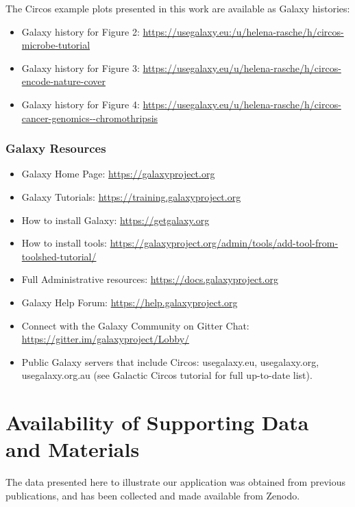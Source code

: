 The Circos example plots presented in this work are available as Galaxy histories:

\begin{itemize}
\item Galaxy history for Figure 2: \url{https://usegalaxy.eu:/u/helena-rasche/h/circos-microbe-tutorial}
\item Galaxy history for Figure 3: \url{https://usegalaxy.eu/u/helena-rasche/h/circos-encode-nature-cover}
\item Galaxy history for Figure 4: \url{https://usegalaxy.eu/u/helena-rasche/h/circos-cancer-genomics--chromothripsis}
\end{itemize}

\subsubsection*{Galaxy Resources}

\begin{itemize}

    \item Galaxy Home Page: \url{https://galaxyproject.org}
    \item Galaxy Tutorials: \url{https://training.galaxyproject.org}
    \item How to install Galaxy: \url{https://getgalaxy.org}
    \item How to install tools: \url{https://galaxyproject.org/admin/tools/add-tool-from-toolshed-tutorial/}
    \item Full Administrative resources: \url{https://docs.galaxyproject.org}
    \item Galaxy Help Forum: \url{https://help.galaxyproject.org}
    \item Connect with the Galaxy Community on Gitter Chat: \url{https://gitter.im/galaxyproject/Lobby/}
    \item Public Galaxy servers that include Circos: usegalaxy.eu, usegalaxy.org, usegalaxy.org.au (see Galactic Circos tutorial for full up-to-date list).
\end{itemize}


\section*{Availability of Supporting Data and Materials}

The data presented here to illustrate our application was obtained from previous publications, and has been collected and made available from Zenodo.

